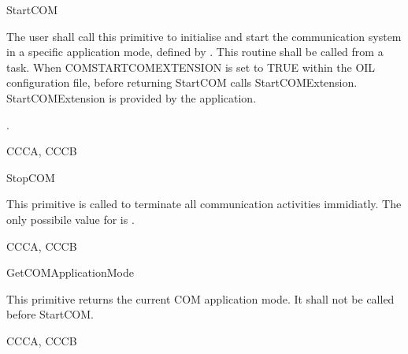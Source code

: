 \begin{function}{StartCOM}
  \begin{fundescription}
    The user shall call this primitive to initialise and start the  communication 
    system in a specific application mode, defined by . This routine 
    shall be called from a task. When COMSTARTCOMEXTENSION  is set to TRUE 
    within the OIL configuration file, before returning StartCOM calls 
    StartCOMExtension. StartCOMExtension is provided by the application.  
  \end{fundescription}
  \begin{funparameters}
  \end{funparameters}
  \begin{funreturn}
    .
  \end{funreturn}
  \begin{funconformance}
    CCCA, CCCB
  \end{funconformance}
\end{function}

\begin{function}{StopCOM}
  \begin{fundescription}
    This primitive is called to terminate all communication activities immidiatly. 
    The only possibile value for  is . 
  \end{fundescription}
  \begin{funparameters}
  \end{funparameters}
  \begin{funreturn}
  \end{funreturn}
  \begin{funconformance}
    CCCA, CCCB
  \end{funconformance}
\end{function}


\begin{function}{GetCOMApplicationMode}
  \begin{fundescription}
    This primitive returns the current COM application mode. It shall not be 
    called before StartCOM.
  \end{fundescription}
  \begin{funreturn}
  \end{funreturn}
  \begin{funconformance}
    CCCA, CCCB
  \end{funconformance}
\end{function}

